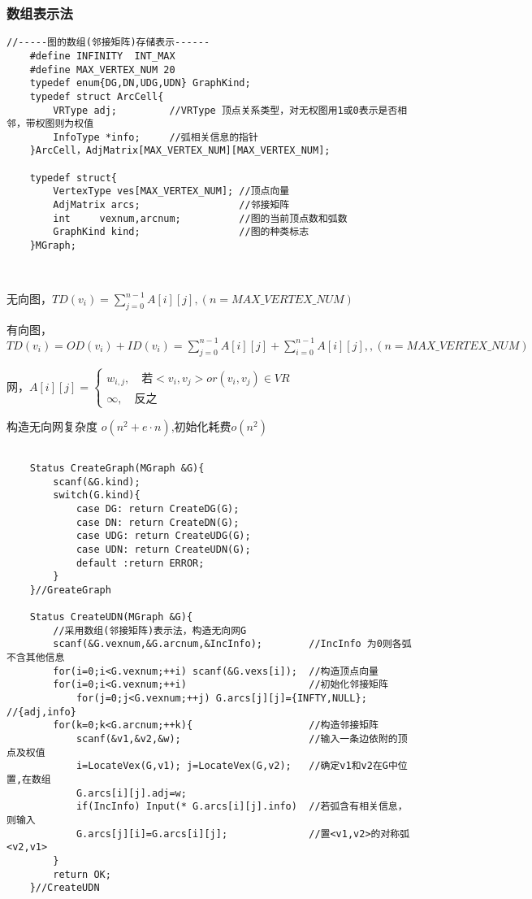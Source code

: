 \documentclass[UTF8]{ctexart}
\newcommand{\mt}[1]{\text{#1}}
\newcommand{\q}{\quad}
\newcommand{\fcz}[1] {
    \left\{
        \begin{array}{llll} #1 \end{array}
    \right.
}
\begin{document}
\newpage

\subsubsection{数组表示法}


\begin{lstlisting}[style=v1]
    //-----图的数组(邻接矩阵)存储表示------
    #define INFINITY  INT_MAX
    #define MAX_VERTEX_NUM 20
    typedef enum{DG,DN,UDG,UDN} GraphKind;
    typedef struct ArcCell{
        VRType adj;         //VRType 顶点关系类型，对无权图用1或0表示是否相邻，带权图则为权值
        InfoType *info;     //弧相关信息的指针    
    }ArcCell，AdjMatrix[MAX_VERTEX_NUM][MAX_VERTEX_NUM];

    typedef struct{
        VertexType ves[MAX_VERTEX_NUM]; //顶点向量
        AdjMatrix arcs;                 //邻接矩阵
        int     vexnum,arcnum;          //图的当前顶点数和弧数
        GraphKind kind;                 //图的种类标志
    }MGraph;



\end{lstlisting}

无向图，$TD(v_i)=\sum_{j=0}^{n-1}A[i][j] ,(n=MAX\_VERTEX\_NUM)$

有向图，$TD(v_i)=OD(v_i)+ID(v_i)=\sum_{j=0}^{n-1}A[i][j] +\sum_{i=0}^{n-1}A[i][j] ,,(n=MAX\_VERTEX\_NUM)$

网，$A[i][j]=\fcz{
    w_{i,j}  ,\q  \mt{若} <v_i,v_j> or (v_i,v_j) \in VR\\
    \infty ,\q \mt{反之}
}$

构造无向网复杂度 $o(n^2+e\cdot n)$,初始化耗费$o(n^2)$ 


\begin{lstlisting}[style=v1]

    Status CreateGraph(MGraph &G){
        scanf(&G.kind);
        switch(G.kind){
            case DG: return CreateDG(G);
            case DN: return CreateDN(G);
            case UDG: return CreateUDG(G);
            case UDN: return CreateUDN(G);
            default :return ERROR;
        }
    }//GreateGraph

    Status CreateUDN(MGraph &G){
        //采用数组(邻接矩阵)表示法，构造无向网G
        scanf(&G.vexnum,&G.arcnum,&IncInfo);        //IncInfo 为0则各弧不含其他信息
        for(i=0;i<G.vexnum;++i) scanf(&G.vexs[i]);  //构造顶点向量
        for(i=0;i<G.vexnum;++i)                     //初始化邻接矩阵
            for(j=0;j<G.vexnum;++j) G.arcs[j][j]={INFTY,NULL};      //{adj,info}
        for(k=0;k<G.arcnum;++k){                    //构造邻接矩阵
            scanf(&v1,&v2,&w);                      //输入一条边依附的顶点及权值
            i=LocateVex(G,v1); j=LocateVex(G,v2);   //确定v1和v2在G中位置,在数组
            G.arcs[i][j].adj=w;
            if(IncInfo) Input(* G.arcs[i][j].info)  //若弧含有相关信息，则输入
            G.arcs[j][i]=G.arcs[i][j];              //置<v1,v2>的对称弧<v2,v1>
        }
        return OK;
    }//CreateUDN
\end{lstlisting}    
\end{document}
